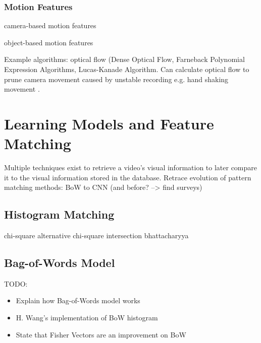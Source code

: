 \subsubsection{Motion Features}

camera-based motion features

object-based motion features

Example algorithms: optical flow (Dense Optical Flow, Farneback Polynomial Expression Algorithms, Lucas-Kanade Algorithm.
Can calculate optical flow to prune camera movement caused by unstable recording e.g. hand shaking movement \cite{wang2016actionregonition}.


\section{Learning Models and Feature Matching}

Multiple techniques exist to retrieve a video's visual information to later compare it to the visual information stored in the database.
Retrace evolution of pattern matching methods: BoW to CNN (and before? --> find surveys)


\subsection{Histogram Matching}

chi-square
alternative chi-square
intersection
bhattacharyya


\subsection{Bag-of-Words Model}

TODO:
\begin{itemize}
    \item Explain how Bag-of-Words model works
    \item H. Wang's implementation of BoW histogram \cite{wang2016actionregonition}
    \item State that Fisher Vectors are an improvement on BoW
\end{itemize}

